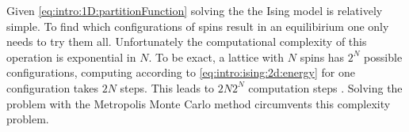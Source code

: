 	Given \cref{eq:intro:1D:partitionFunction} solving the the Ising model is relatively simple. To find which configurations of spins result in an equilibirium one only needs to try them all. Unfortunately the computational complexity of this operation is exponential in $N$. To be exact, a lattice with $N$ spins has $2^N$ possible configurations, computing \energy according to \cref{eq:intro:ising:2d:energy} for one configuration takes $2N$ steps. This leads to $2N2^N$ computation steps \cite{kenzel1997physics}. Solving the problem with the Metropolis Monte Carlo method circumvents this complexity problem. 